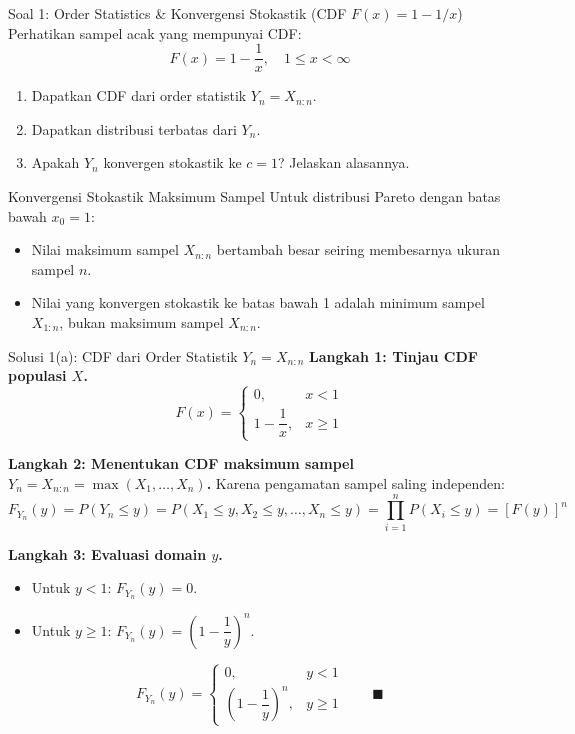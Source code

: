 \documentclass[10pt,twoside]{article}
\begin{document}
\begin{soalbox}{Soal 1: Order Statistics \& Konvergensi Stokastik (CDF $F(x) = 1 - 1/x$)}
Perhatikan sampel acak yang mempunyai CDF:
\[
F(x) = 1 - \frac{1}{x}, \quad 1 \le x < \infty
\]
\begin{enumerate}[label=(\alph*)]
  \item Dapatkan CDF dari order statistik $Y_n = X_{n:n}$.
  \item Dapatkan distribusi terbatas dari $Y_n$.
  \item Apakah $Y_n$ konvergen stokastik ke $c = 1$? Jelaskan alasannya.
\end{enumerate}
\end{soalbox}

\begin{tipbox}{Konvergensi Stokastik Maksimum Sampel}
Untuk distribusi Pareto dengan batas bawah $x_0 = 1$:
\begin{itemize}
  \item Nilai maksimum sampel $X_{n:n}$ bertambah besar seiring membesarnya ukuran sampel $n$.
  \item Nilai yang konvergen stokastik ke batas bawah 1 adalah minimum sampel $X_{1:n}$, bukan maksimum sampel $X_{n:n}$.
\end{itemize}
\end{tipbox}

\begin{solbox}{Solusi 1(a): CDF dari Order Statistik $Y_n = X_{n:n}$}
\textbf{Langkah 1: Tinjau CDF populasi $X$.}
\[
F(x) = \begin{cases} 0, & x < 1 \\ 1 - \dfrac{1}{x}, & x \ge 1 \end{cases}
\]

\textbf{Langkah 2: Menentukan CDF maksimum sampel $Y_n = X_{n:n} = \max(X_1, \dots, X_n)$.}
Karena pengamatan sampel saling independen:
\[
F_{Y_n}(y) = P(Y_n \le y) = P(X_1 \le y, X_2 \le y, \dots, X_n \le y) = \prod_{i=1}^n P(X_i \le y) = [F(y)]^n
\]

\textbf{Langkah 3: Evaluasi domain $y$.}
\begin{itemize}
  \item Untuk $y < 1$: $F_{Y_n}(y) = 0$.
  \item Untuk $y \ge 1$: $F_{Y_n}(y) = \left(1 - \dfrac{1}{y}\right)^n$.
\end{itemize}

\[
\boxed{F_{Y_n}(y) = \begin{cases} 0, & y < 1 \\ \left(1 - \dfrac{1}{y}\right)^n, & y \ge 1 \end{cases}} \qquad \blacksquare
\]
\end{solbox}
\end{document}
